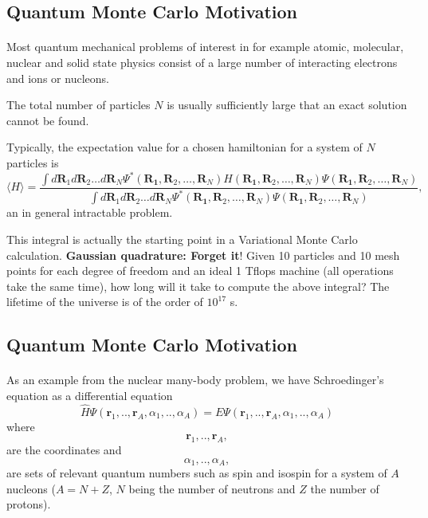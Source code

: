 \documentclass[%
twoside,                 %
final,                   %
10pt]{article}
\begin{document}
\noindent





\subsection*{Quantum Monte Carlo Motivation}

\paragraph{}
Most quantum mechanical  problems of interest in for example atomic, molecular, nuclear and solid state 
physics consist of a large number of interacting electrons and ions or nucleons. 

The total number of particles $N$ is usually sufficiently large
that an exact solution cannot be found. 

Typically, 
the expectation value for a chosen hamiltonian for a system of  $N$ particles is
\[
   \langle H \rangle =
   \frac{\int d\bm{R}_1d\bm{R}_2\dots d\bm{R}_N
         \Psi^{\ast}(\bm{R_1},\bm{R}_2,\dots,\bm{R}_N)
          H(\bm{R_1},\bm{R}_2,\dots,\bm{R}_N)
          \Psi(\bm{R_1},\bm{R}_2,\dots,\bm{R}_N)}
        {\int d\bm{R}_1d\bm{R}_2\dots d\bm{R}_N
        \Psi^{\ast}(\bm{R_1},\bm{R}_2,\dots,\bm{R}_N)
        \Psi(\bm{R_1},\bm{R}_2,\dots,\bm{R}_N)},
\]
an in general intractable problem.

 This integral is actually the starting point in a Variational Monte Carlo calculation. \textbf{Gaussian quadrature: Forget it}! Given 10 particles and 10 mesh points for each degree of freedom
and an
 ideal 1 Tflops machine (all operations take the same time), how long will it take to compute the above integral? The lifetime of the universe is of the order of $10^{17}$ s.




\subsection*{Quantum Monte Carlo Motivation}

\paragraph{}
As an example from the nuclear many-body problem, we have Schroedinger's equation as a differential equation
\[
  \hat{H}\Psi(\bm{r}_1,..,\bm{r}_A,\alpha_1,..,\alpha_A)=E\Psi(\bm{r}_1,..,\bm{r}_A,\alpha_1,..,\alpha_A)
\]
where
\[
  \bm{r}_1,..,\bm{r}_A,
\]
are the coordinates and 
\[
  \alpha_1,..,\alpha_A,
\]
are sets of relevant quantum numbers such as spin and isospin for a system of  $A$ nucleons ($A=N+Z$, $N$ being the number of neutrons and $Z$ the number of protons).
\end{document}
